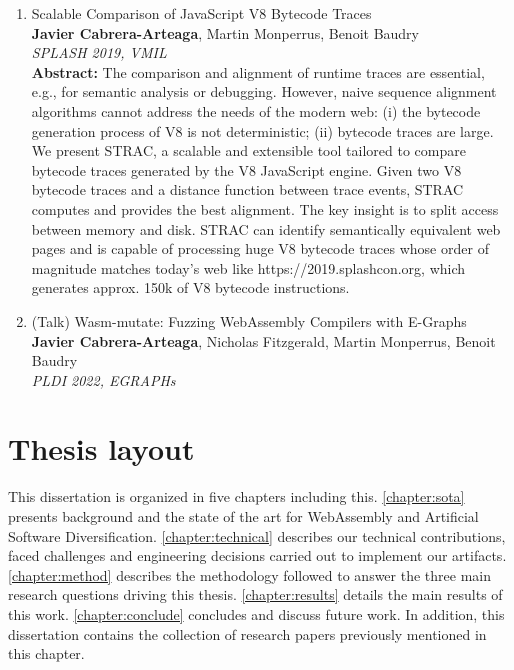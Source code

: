 \begin{enumerate}
    \item Scalable Comparison of JavaScript V8 Bytecode Traces \cite{STRAC}\\
    {\small\textbf{Javier Cabrera-Arteaga}, Martin Monperrus, Benoit Baudry}\\
    \emph{SPLASH 2019, VMIL}\\
    {\small
    \textbf{Abstract:} 
    The comparison and alignment of runtime traces are essential, e.g., for semantic analysis or debugging. However, naive sequence alignment algorithms cannot address the needs of the modern web: (i) the bytecode generation process of V8 is not deterministic; (ii) bytecode traces are large.
    We present STRAC, a scalable and extensible tool tailored to compare bytecode traces generated by the V8 JavaScript engine. Given two V8 bytecode traces and a distance function between trace events, STRAC computes and provides the best alignment. The key insight is to split access between memory and disk. STRAC can identify semantically equivalent web pages and is capable of processing huge V8 bytecode traces whose order of magnitude matches today's web like https://2019.splashcon.org, which generates approx. 150k of V8 bytecode instructions.
     }
    \item (Talk) Wasm-mutate: Fuzzing WebAssembly Compilers with E-Graphs\\
    \textbf{Javier Cabrera-Arteaga}, Nicholas Fitzgerald, Martin Monperrus, Benoit Baudry\\
    \emph{PLDI 2022, EGRAPHs}\\
\end{enumerate}

\section*{Thesis layout}

This dissertation is organized in five chapters including this. \autoref{chapter:sota} presents background and the state of the art for WebAssembly and Artificial Software Diversification.
\autoref{chapter:technical} describes our technical contributions, faced challenges and engineering decisions carried out to implement our artifacts. \autoref{chapter:method} describes the methodology followed to answer the three main
research questions driving this thesis. \autoref{chapter:results} details the main results of this work. \autoref{chapter:conclude} concludes and discuss future work. 
In addition, this dissertation contains the collection of research papers previously mentioned in this chapter.